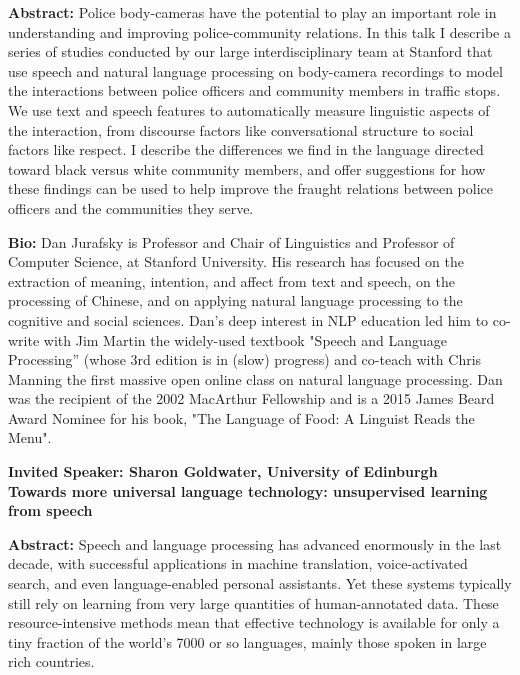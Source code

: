 \documentclass[11pt]{article}
\begin{document}
{\bf Abstract:}
Police body-cameras have the potential to play an important role in understanding and improving police-community relations. In this talk I describe a series of studies conducted by our large interdisciplinary team at Stanford that use speech and natural language processing on body-camera recordings to model the interactions between police officers and community members in traffic stops. We use text and speech features to automatically measure linguistic aspects of the interaction, from discourse factors like conversational structure to social factors like respect. I describe the differences we find in the language directed toward black versus white community members, and offer suggestions for how these findings can be used to help improve the fraught relations between police officers and the communities they serve.


{\bf Bio:} 
Dan Jurafsky is Professor and Chair of Linguistics and Professor of Computer Science, at Stanford University. His research has focused on the extraction of meaning, intention, and affect from text and speech, on the processing of Chinese, and on applying natural language processing to the cognitive and social sciences. Dan's deep interest in NLP education led him to co-write with Jim Martin the widely-used textbook "Speech and Language Processing” (whose 3rd edition is in (slow) progress) and co-teach with Chris Manning the first massive open online class on natural language processing. Dan was the recipient of the 2002 MacArthur Fellowship and is a 2015 James Beard Award Nominee for his book, "The Language of Food: A Linguist Reads the Menu".

\begin{center}
{\LARGE \bf Invited Speaker: Sharon Goldwater,  University of Edinburgh}\\
{\Large \bf Towards more universal language technology: unsupervised learning from speech}
\end{center}


{\bf Abstract:}
Speech and language processing has advanced enormously in the last decade, with successful applications in machine translation, voice-activated search, and even language-enabled personal assistants. Yet these systems typically still rely on learning from very large quantities of human-annotated data. These resource-intensive methods mean that effective technology is available for only a tiny fraction of the world's 7000 or so languages, mainly those spoken in large rich countries. 
\end{document}
